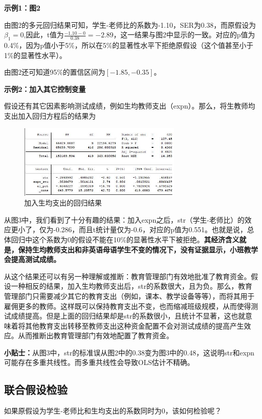 \documentclass[cn,12pt,math=newtx,citestyle=gb7714-2015,bibstyle=gb7714-2015]{elegantbook}
\begin{document}
	\textbf{示例1：图2}
	
	由图2的多元回归结果可知，学生-老师比的系数为-1.10，SER为0.38，而原假设为$\beta_1=0$,因此，t值为$\frac{-1.10-0}{0.38}=-2.89$，这一结果与图2中显示的一致。对应的p值为0.4\%，因为p值小于5\%，所以在5\%的显著性水平下拒绝原假设（这个值甚至小于1\%的显著性水平）。
	
	由图2还可知道95\%的置信区间为$[-1.85,-0.35]$。
	
	\textbf{示例2：加入其它控制变量}
	
	假设还有其它因素影响测试成绩，例如生均教师支出（expn）。那么，将生教师均支出加入回归方程后的结果为
	\begin{figure}[htbp]
		\centering
		\includegraphics[width=0.7\textwidth]{expn.jpg}
		\caption{加入生均支出的回归结果}\label{fig:digit}
	\end{figure}
	
	从图3中，我们看到了十分有趣的结果：加入expn之后，str（学生-老师比）的效应更小了，仅为-0.286，而且t统计量仅为-0.6，对应的p值为0.551。也就是说，总体回归中这个系数为0的假设不能在10\%的显著性水平下被拒绝。\textbf{其经济含义就是，保持生均教师支出和非英语母语学生不变的情况下，没有证据显示，小班教学会提高测试成绩。}
	
	从这个结果还可以有另一种理解或推断：教育管理部门有效地批准了教育资金。假设一种相反的结果，加入生均教师支出后，str的系数很大，且为负。那么，教育管理部门只需要减少其它的教育支出（例如，课本、教学设备等等），而将其用于雇佣更多的教师。这样既可以保持教育支出不变，也而缩减班级规模，从而使得测试成绩提高。但是上面的回归结果却是str的系数很小，且统计不显著，这也就意味着将其他教育支出转移至教师支出这种资金配置不会对测试成绩的提高产生效应。从而推断出教育管理部门有效地配置了教育资金。
	
	\textbf{小贴士：}从图3中，str的标准误从图2中的0.38变为图3中的0.48，这说明str和expn可能存在多重共线性。而多重共线性会导致OLS估计不精确。
	
	\subsection{联合假设检验}
	如果原假设为学生-老师比和生均支出的系数同时为0，该如何检验呢？
	
\end{document}
